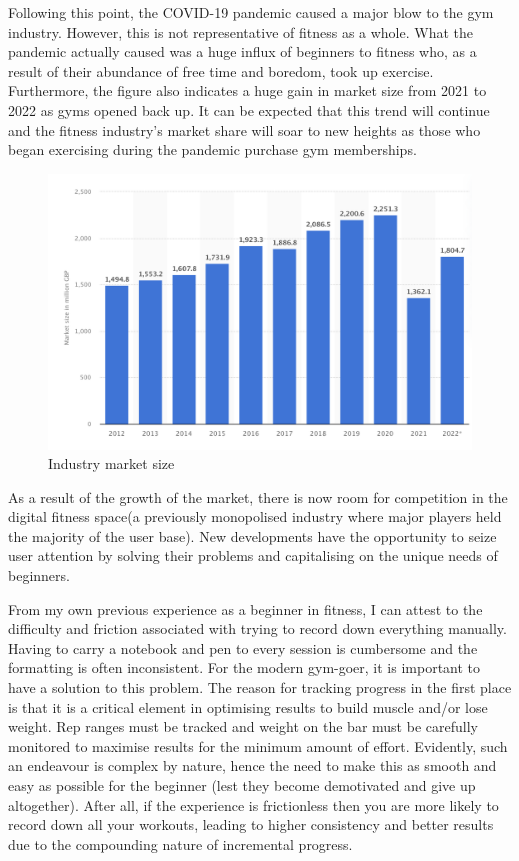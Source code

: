 \documentclass{article}
\begin{document}
Following this point, the COVID-19 pandemic caused a major blow to the gym industry. However, this is not representative of fitness as a whole. What the pandemic actually caused was a huge influx of beginners to fitness who, as a result of their abundance of free time and boredom, took up exercise. Furthermore, the figure also indicates a huge gain in market size from 2021 to 2022 as gyms opened back up. It can be expected that this trend will continue and the fitness industry’s market share will soar to new heights as those who began exercising during the pandemic purchase gym memberships.
\begin{figure}[ht]
  \raggedright
  \includegraphics[width=1\textwidth]{Figure 1.png}
  \caption{Industry market size}
  \label{fig:Figure 1}
\end{figure}

As a result of the growth of the market, there is now room for competition in the digital fitness space(a previously monopolised industry where major players held the majority of the user base). New developments have the opportunity to seize user attention by solving their problems and capitalising on the unique needs of beginners.

From my own previous experience as a beginner in fitness, I can attest to the difficulty and friction associated with trying to record down everything manually. Having to carry a notebook and pen to every session is cumbersome and the formatting is often inconsistent. For the modern gym-goer, it is important to have a solution to this problem. The reason for tracking progress in the first place is that it is a critical element in optimising results to build muscle and/or lose weight. Rep ranges must be tracked and weight on the bar must be carefully monitored to maximise results for the minimum amount of effort. Evidently, such an endeavour is complex by nature, hence the need to make this as smooth and easy as possible for the beginner (lest they become demotivated and give up altogether). After all, if the experience is frictionless then you are more likely to record down all your workouts, leading to higher consistency and better results due to the compounding nature of incremental progress. 
\end{document}
